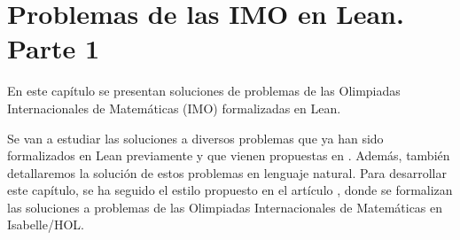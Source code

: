 \chapter{Problemas de las IMO en Lean. Parte 1}

En este capítulo se presentan soluciones de problemas de las Olimpiadas
Internacionales de Matemáticas (IMO) formalizadas en Lean.

Se van a estudiar las soluciones a diversos problemas que ya han sido
formalizados en Lean previamente y que vienen propuestas en \cite{IM}.
Además, también detallaremos la solución de estos problemas en lenguaje
natural. Para desarrollar este capítulo, se ha seguido el estilo propuesto
en el artículo \cite{ART}, donde se formalizan las soluciones a problemas
de las Olimpiadas Internacionales de Matemáticas en Isabelle/HOL.








